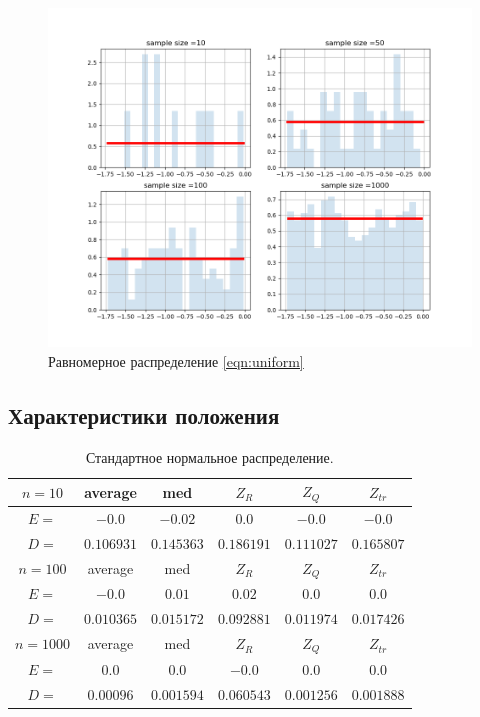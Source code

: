 \documentclass[a4]{article}
\begin{document}
\begin{figure}[H]
    \centering
    \includegraphics[width=\textwidth]{Lab1_uniform.png}
    \caption{Равномерное распределение \eqref{eqn:uniform}}
    \label{fig:dis_uni_gis}
\end{figure}


\subsection{Характеристики положения}
\begin{table}[H]
	\caption{\label{tab:normal} Стандартное нормальное распределение.}
	\begin{center}
		\begin{tabular}{|c|c|c|c|c|c|}
			\hline
			$n = 10$ & average & med & $Z_R$ & $Z_Q$ & $Z_{tr}$\\
			\hline
			$E =$ & $-0.0$ & $-0.02$ & $0.0$ & $-0.0$ & $-0.0$ \\
			\hline
			$D =$ & $0.106931$ & $0.145363$ & $0.186191$ & $0.111027$ & $0.165807$ \\
			\hline
			$n = 100$ & average & med & $Z_R$ & $Z_Q$ & $Z_{tr}$\\
			\hline
			$E =$ & $-0.0$ & $0.01$ & $0.02$ & $0.0$ & $0.0$\\
			\hline
			$D =$ & $0.010365$ &  $0.015172$ &  $0.092881$ &  $0.011974$ &  $0.017426$\\
			\hline
			$n = 1000$ & average & med & $Z_R$ & $Z_Q$ & $Z_{tr}$\\
			\hline
			$E =$ & $0.0$ & $0.0$ & $-0.0$ & $0.0$ & $0.0$\\
			\hline
			$D =$ & $0.00096$ &  $0.001594$ &  $0.060543$ &  $0.001256$ &  $0.001888$\\
			\hline
		\end{tabular}
	\end{center}
\end{table}
\end{document}
